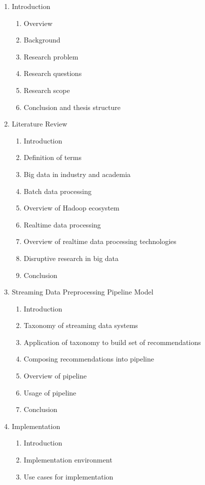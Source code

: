 \documentclass[a4paper,11pt]{article}
\begin{document}
\begin{enumerate}
  \item Introduction
  \begin{enumerate}[label*=\arabic*.]
    \item Overview
    \item Background
    \item Research problem
    \item Research questions
    \item Research scope
    \item Conclusion and thesis structure
  \end{enumerate}
  \item Literature Review
  \begin{enumerate}[label*=\arabic*.]
    \item Introduction
    \item Definition of terms
    \item Big data in industry and academia
    \item Batch data processing
    \item Overview of Hadoop ecosystem
    \item Realtime data processing
    \item Overview of realtime data processing technologies
    \item Disruptive research in big data
    \item Conclusion
  \end{enumerate}
  \item Streaming Data Preprocessing Pipeline Model
  \begin{enumerate}[label*=\arabic*.]
    \item Introduction
    \item Taxonomy of streaming data systems
    \item Application of taxonomy to build set of recommendations
    \item Composing recommendations into pipeline
    \item Overview of pipeline
    \item Usage of pipeline
    \item Conclusion
  \end{enumerate}
  \item Implementation
  \begin{enumerate}[label*=\arabic*.]
    \item Introduction
    \item Implementation environment
    \item Use cases for implementation

\end{enumerate}
\end{enumerate}
\end{document}
